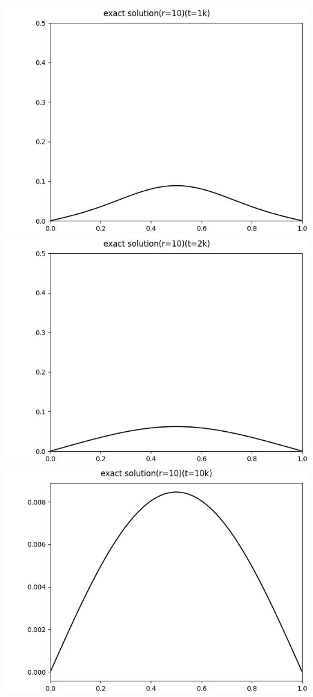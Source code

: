 \documentclass[12pt]{ctexart}
\begin{document}
\includegraphics[scale=0.35]{exact solution(r=10)(t=1k).jpg}
\includegraphics[scale=0.35]{exact solution(r=10)(t=2k).jpg}
\includegraphics[scale=0.35]{exact solution(r=10)(t=10k).jpg}
\end{document}
